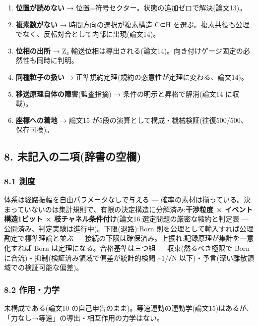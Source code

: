 \documentclass[
]{ltjsarticle}
\providecommand{\tightlist}{%
  \setlength{\itemsep}{0pt}\setlength{\parskip}{0pt}}
\begin{document}
\begin{enumerate}
\def\labelenumi{\arabic{enumi}.}
\tightlist
\item
  \textbf{位置が読めない} →
  位置=符号セクター。状態の追加ゼロで解決(論文13)。
\item
  \textbf{複素数がない} → 時間方向の選択が複素構造 C⊂H
  を選ぶ。複素共役も公理でなく、反転対合として内部に出現(論文14)。
\item
  \textbf{位相の出所} → Z₄
  輸送位相は導出される(論文14)。向き付けゲージ固定の必然性も同時に判明。
\item
  \textbf{同種粒子の扱い} →
  正準規約定理(規約の恣意性が定理に変わる、論文14)。
\item
  \textbf{移送原理自体の障害}(監査指摘) → 条件の明示と昇格で解消(論文14
  に収載)。
\item
  \textbf{座標への着地} → 論文15
  が5段の演算として構成・機械検証(往復500/500、保存可換)。
\end{enumerate}

\subsection{8.
未記入の二項(辞書の空欄)}\label{ux672aux8a18ux5165ux306eux4e8cux9805ux8f9eux66f8ux306eux7a7aux6b04}

\subsubsection{8.1 測度}\label{ux6e2cux5ea6}

体系は経路振幅を自由パラメータなしで与える ---
確率の素材は揃っている。決まっていないのは集計規則で、有限の決定構造に分解済み:\textbf{干渉粒度
× イベント構造1ビット ×
枝チャネル条件付け}(論文16:選定問題の厳密な縮約と判定表 ---
公開済み、判定実験は進行中)。下限(退路):Born
則を公理として輸入すれば公理勘定で標準理論と並ぶ ---
接続の下限は確保済み。上振れ:記録原理が集計を一意化すれば Born
は定理になる。合格基準は三つ組 --- 収束(然るべき極限で Born
に合流)・抑制(検証済み領域で偏差が統計的検閲 \textasciitilde1/√N
以下)・予言(深い離散領域での検証可能な偏差)。

\subsubsection{8.2 作用・力学}\label{ux4f5cux7528ux529bux5b66}

未構成である(論文10
の自己申告のまま)。等速運動の運動学(論文15)はあるが、「力なし→等速」の導出・相互作用の力学はない。
\end{document}
